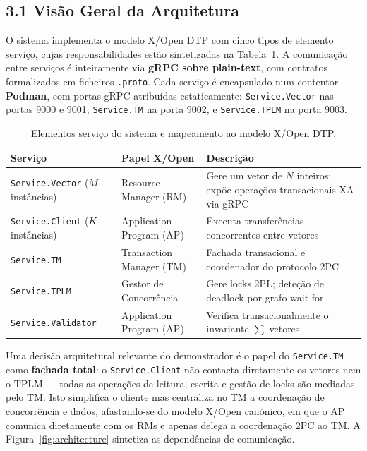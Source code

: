 
\subsection*{3.1 Visão Geral da Arquitetura}

O sistema implementa o modelo X/Open DTP com cinco tipos de elemento serviço, cujas
responsabilidades estão sintetizadas na Tabela~\ref{tab:servicos}. A comunicação entre
serviços é inteiramente via \textbf{gRPC sobre plain-text}, com contratos formalizados em
ficheiros \texttt{.proto}. Cada serviço é encapsulado num contentor \textbf{Podman},
com portas gRPC atribuídas estaticamente: \texttt{Service.Vector} nas portas 9000 e 9001,
\texttt{Service.TM} na porta 9002, e \texttt{Service.TPLM} na porta 9003.

\begin{table}[ht]
\centering
\begin{tabularx}{\textwidth}{llX}
\toprule
\textbf{Serviço} & \textbf{Papel X/Open} & \textbf{Descrição} \\
\midrule
\texttt{Service.Vector} ($M$ instâncias) & Resource Manager (RM) &
  Gere um vetor de $N$ inteiros; expõe operações transacionais XA via gRPC \\
\texttt{Service.Client} ($K$ instâncias) & Application Program (AP) &
  Executa transferências concorrentes entre vetores \\
\texttt{Service.TM}                      & Transaction Manager (TM) &
  Fachada transacional e coordenador do protocolo 2PC \\
\texttt{Service.TPLM}                    & Gestor de Concorrência &
  Gere locks 2PL; deteção de deadlock por grafo wait-for \\
\texttt{Service.Validator}               & Application Program (AP) &
  Verifica transacionalmente o invariante $\sum$ vetores \\
\bottomrule
\end{tabularx}
\caption{Elementos serviço do sistema e mapeamento ao modelo X/Open DTP.}
\label{tab:servicos}
\end{table}

Uma decisão arquitetural relevante do demonstrador é o papel do \texttt{Service.TM} como
\textbf{fachada total}: o \texttt{Service.Client} não contacta diretamente os vetores nem o
TPLM --- todas as operações de leitura, escrita e gestão de locks são mediadas pelo TM. Isto
simplifica o cliente mas centraliza no TM a coordenação de concorrência e dados, afastando-se
do modelo X/Open canónico, em que o AP comunica diretamente com os RMs e apenas delega a
coordenação 2PC ao TM. A Figura~\ref{fig:architecture} sintetiza as dependências de
comunicação.

